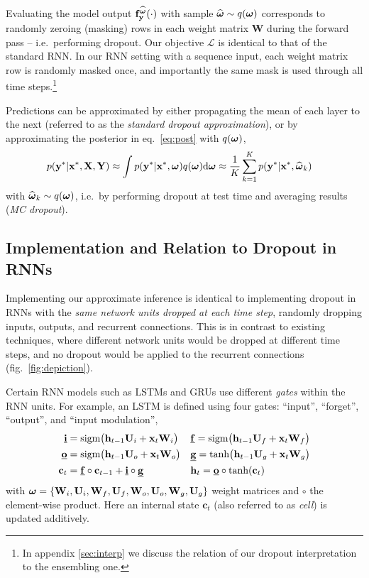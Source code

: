 \documentclass{article}
\renewcommand{\c}{\mathbf{c}}
\newcommand{\cL}{\mathcal{L}}
\newcommand{\td}{\text{d}}
\newcommand{\f}{\mathbf{f}}
\newcommand{\x}{\mathbf{x}}
\newcommand{\y}{\mathbf{y}}
\newcommand{\W}{\mathbf{W}}
\newcommand{\X}{\mathbf{X}}
\newcommand{\Y}{\mathbf{Y}}
\newcommand{\bo}{\text{\boldmath$\omega$}}
\theoremstyle{definition}
\begin{document}
Evaluating the model output $\f^{\boh}_\y(\cdot)$ with sample $\boh \sim q(\bo)$ corresponds to randomly zeroing (masking) rows in each weight matrix $\W$ during the forward pass -- i.e.\ performing dropout. 
Our objective $\cL$ is identical to that of the standard RNN.
In our RNN setting with a sequence input, each weight matrix row is randomly masked once, and importantly the same mask is used through all time steps.\footnote{In appendix \ref{sec:interp} we discuss the relation of our dropout interpretation to the ensembling one.}

Predictions can be approximated by either propagating the mean of each layer to the next (referred to as the \textit{standard dropout approximation}), or by approximating the posterior in eq.\ \eqref{eq:post} with $q(
\bo)$,
\begin{align} \label{eq:approx_predictive}
p(\y^* | \x^*, \X, \Y) &\approx
\int p ( \y^* | \x^*, \bo ) q ( \bo ) \td \bo
\approx \frac{1}{K} \sum_{k=1}^K p ( \y^* | \x^*, \widehat{\bo}_k )
\end{align}
with $\widehat{\bo}_k \sim q ( \bo )$, i.e.\ by performing dropout at test time and averaging results (\textit{MC dropout}).



\subsection{Implementation and Relation to Dropout in RNNs}
\label{sec:impl-details}


Implementing our approximate inference is identical to implementing dropout in RNNs with the \textit{same network units dropped at each time step}, randomly dropping inputs, outputs, and recurrent connections. This is in contrast to existing techniques, where different network units would be dropped at different time steps, and no dropout would be applied to the recurrent connections (fig.\ \ref{fig:depiction}). 

Certain RNN models such as LSTMs and GRUs use different \textit{gates} within the RNN units. 
For example, an LSTM is defined using four gates: ``input'', ``forget'', ``output'', and ``input modulation'',
\renewcommand{\i}{\mathbf{i}}
\newcommand{\g}{\mathbf{g}}
\renewcommand{\o}{\mathbf{o}}
\begin{align}\label{eq:non-tied-weights}
\underline{\i} &= \text{sigm} \big(\h_{t-1} \U_i + \x_t \W_i 
\big) &&
\underline{\f} = \text{sigm} \big(\h_{t-1} \U_f + \x_t \W_f 
\big) \notag \\
\underline{\o} &= \text{sigm} \big(\h_{t-1} \U_o + \x_t \W_o 
\big) && 
\underline{\g} = \text{tanh} \big(\h_{t-1} \U_g + \x_t \W_g 
\big) \notag \\
\c_t &= 
\underline{\f} \circ \c_{t-1} + \underline{\i} \circ \underline{\g} &&
\h_t =  \underline{\o} \circ \text{tanh}(\c_t)
\end{align}
with $\bo = \{ \W_i, \U_i, \W_f, \U_f, \W_o, \U_o, \W_g, \U_g\}$ weight matrices and $\circ$ the element-wise product. 
Here an internal state $\c_t$ (also referred to as \textit{cell}) is updated additively. 
\end{document}
